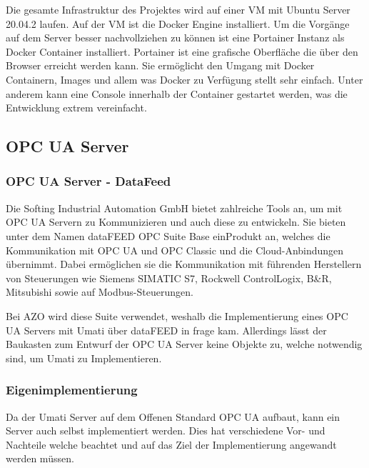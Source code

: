 \documentclass[a4paper, 12pt, oneside, toc=listofnumbered, bibliography=totoc]{scrbook}
\begin{document}
		Die gesamte Infrastruktur des Projektes wird auf einer VM mit Ubuntu Server 20.04.2 laufen. Auf der VM ist die Docker Engine installiert. Um die Vorgänge auf dem Server besser nachvollziehen zu können ist eine Portainer Instanz als Docker Container installiert. Portainer ist eine grafische Oberfläche die über den Browser erreicht werden kann. Sie ermöglicht den Umgang mit Docker Containern, Images und allem was Docker zu Verfügung stellt sehr einfach. Unter anderem kann eine Console innerhalb der Container gestartet werden, was die Entwicklung extrem vereinfacht. 
		
		\subsection{OPC UA Server}
		
			\subsubsection{OPC UA Server - DataFeed}
				
			Die Softing Industrial Automation GmbH bietet zahlreiche Tools an, um mit OPC UA Servern zu Kommunizieren und auch diese zu entwickeln. Sie bieten unter dem Namen dataFEED OPC Suite Base einProdukt an, welches die Kommunikation mit OPC UA und OPC Classic und die Cloud-Anbindungen übernimmt. Dabei ermöglichen sie die Kommunikation mit führenden Herstellern von Steuerungen wie  Siemens SIMATIC S7, Rockwell ControlLogix, B\&R, Mitsubishi sowie auf Modbus-Steuerungen. \cite{noauthor_datafeed_nodate}
			
			Bei AZO wird diese Suite verwendet, weshalb die Implementierung eines OPC UA Servers mit Umati über dataFEED in frage kam. Allerdings lässt der Baukasten zum Entwurf der OPC UA Server keine Objekte zu, welche notwendig sind, um Umati zu Implementieren.
					
			\subsubsection{Eigenimplementierung}
		
					
			Da der Umati Server auf dem Offenen Standard OPC UA aufbaut, kann ein Server auch selbst implementiert werden. Dies hat verschiedene Vor- und Nachteile welche beachtet und auf das Ziel der Implementierung angewandt werden müssen. 
			
\end{document}
